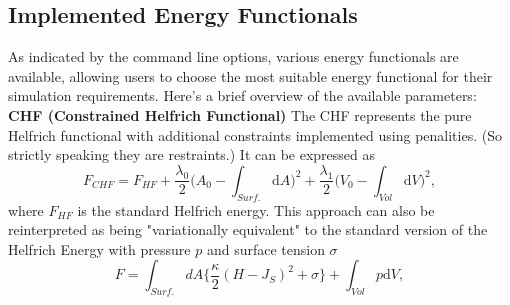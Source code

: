 \documentclass[11pt]{article}
\newcommand{\D}[1]{\mathrm{d#1}}
\begin{document}
\subsection{Implemented Energy Functionals}
As indicated by the command line options, various energy functionals are available, allowing users to choose the most suitable energy functional for their simulation requirements. Here's a brief overview of the available parameters:
\\
\noindent
\textbf{CHF (Constrained Helfrich Functional)}
The CHF represents the pure Helfrich functional with additional constraints implemented using penalities. (So strictly speaking they are restraints.) 
 It can be expressed as
 \begin{equation}
   F_{CHF} = F_{HF} +     \frac{\lambda_0}{2} \bigg(A_0- \int_{Surf.} \mathrm{d}A\bigg)^2  +  \frac{\lambda_1}{2} \bigg(V_0-\int_{Vol} \mathrm{d}V\bigg)^2,
  \end{equation}
 where $F_{HF}$ is the standard Helfrich energy.
This approach can also be reinterpreted as being "variationally equivalent" to the standard version of the Helfrich Energy with pressure $p$ and surface tension $\sigma$ 
\begin{equation}
  F = \int_{Surf.} dA  \bigg\{ \frac{{\kappa}}{2} (H-J_S)^2 + \sigma \bigg\}  + \int_{Vol} p \mathrm{d}V,
\end{equation}
\end{document}
